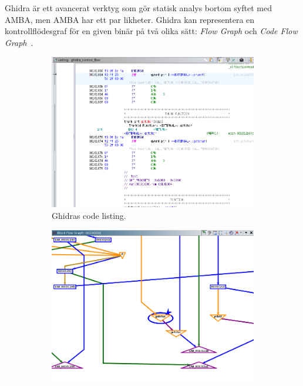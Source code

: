 Ghidra är ett avancerat verktyg som gör statisk analys bortom syftet med AMBA,
men AMBA har ett par likheter. Ghidra kan representera en kontrollflödesgraf
för en given binär på två olika sätt: \textit{Flow Graph} och \textit{Code Flow
    Graph}~\cite{ghidra_website}.

\begin{figure}[H]
    \begin{subfigure}{0.3\textwidth}
        \includegraphics[width=\linewidth]{figures/ghidra_code_listing.png}
        \caption{Ghidras code listing.} \label{fig:ghidra_code_listing}
    \end{subfigure}
    \hspace*{\fill}
    \begin{subfigure}{0.3\textwidth}
        \includegraphics[width=\linewidth]{figures/ghidra_block_flow_graph.png}

\end{subfigure}
\end{figure}

